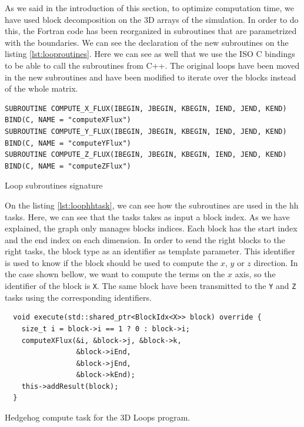 As we said in the introduction of this section, to optimize computation time, we
have used block decomposition on the 3D arrays of the simulation. In order to do
this, the Fortran code has been reorganized in subroutines that are parametrized
with the boundaries. We can see the declaration of the new subroutines on the
listing \ref{lst:looproutines}. Here we can see as well that we use the ISO C
bindings to be able to call the subroutines from C++. The original loops have
been moved in the new subroutines and have been modified to iterate over the
blocks instead of the whole matrix.

\begin{listing}[ht!]
\begin{verbatim}
SUBROUTINE COMPUTE_X_FLUX(IBEGIN, JBEGIN, KBEGIN, IEND, JEND, KEND) BIND(C, NAME = "computeXFlux")
SUBROUTINE COMPUTE_Y_FLUX(IBEGIN, JBEGIN, KBEGIN, IEND, JEND, KEND) BIND(C, NAME = "computeYFlux")
SUBROUTINE COMPUTE_Z_FLUX(IBEGIN, JBEGIN, KBEGIN, IEND, JEND, KEND) BIND(C, NAME = "computeZFlux")
\end{verbatim}
\caption{Loop subroutines signature}
\label{lst:looproutines}
\end{listing}

On the listing \ref{lst:loophhtask}, we can see how the subroutines are used in
the \gls{hh} tasks. Here, we can see that the tasks takes as input a block
index. As we have explained, the graph only manages blocks indices. Each block
has the start index and the end index on each dimension. In order to send the
right blocks to the right tasks, the block type as an identifier as template
parameter. This identifier is used to know if the block should be used to
compute the $x$, $y$ or $z$ direction. In the case shown bellow, we want to compute
the terms on the $x$ axis, so the identifier of the block is \texttt{X}.
The same block have been transmitted to the \texttt{Y} and \texttt{Z} tasks
using the corresponding identifiers.

\begin{listing}[ht!]
\begin{verbatim}
  void execute(std::shared_ptr<BlockIdx<X>> block) override {
    size_t i = block->i == 1 ? 0 : block->i;
    computeXFlux(&i, &block->j, &block->k,
                 &block->iEnd,
                 &block->jEnd,
                 &block->kEnd);
    this->addResult(block);
  }
\end{verbatim}
\caption{Hedgehog compute task for the 3D Loops program.}
\label{lst:loophhtask}
\end{listing}

